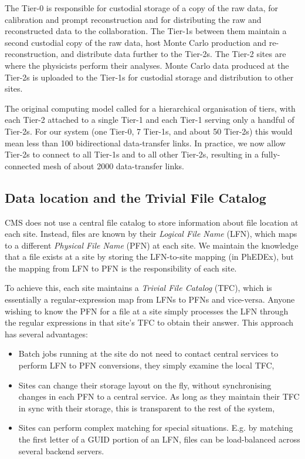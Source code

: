 The Tier-0 is responsible for custodial storage of a copy of the raw data, for calibration and prompt 
reconstruction and for distributing the raw and reconstructed data to the collaboration. The 
Tier-1s between them maintain a second custodial copy of the raw data, host Monte Carlo production and
re-reconstruction, and distribute data further to the Tier-2s.
The Tier-2 sites are where the physicists perform their analyses. Monte Carlo data 
produced at the Tier-2s is uploaded to the Tier-1s for custodial storage and distribution to other sites.

The original computing model \cite{CTDR} called for a hierarchical organisation of tiers, with each Tier-2 
attached to a single Tier-1 and each Tier-1 serving only a handful of Tier-2s. For our system (one 
Tier-0, 7 Tier-1s, and about 50 Tier-2s) this would mean less than 100 bidirectional data-transfer links. In 
practice, we now allow Tier-2s to connect to all Tier-1s and to all other Tier-2s, resulting in a 
fully-connected mesh of about 2000 data-transfer links.

\subsection{Data location and the Trivial File Catalog}
CMS does not use a central file catalog to store information about file location at each site. 
Instead, files are known by their {\it Logical File Name} (LFN), which maps to a different {\it 
Physical File Name} (PFN) at each site. We maintain the knowledge that a file exists at a site by 
storing the LFN-to-site mapping (in PhEDEx), but the mapping from LFN to PFN is the responsibility 
of each site.

To achieve this, each site maintains a {\it Trivial File Catalog} (TFC), which is essentially a 
regular-expression map from LFNs to PFNs and vice-versa. Anyone wishing to know the PFN for a file 
at a site simply processes the LFN through the regular expressions in that site's TFC to obtain 
their answer. This approach has several advantages:

\begin{itemize}
  \item Batch jobs running at the site do not need to contact central services to perform LFN to 
PFN conversions, they simply examine the local TFC,
  \item Sites can change their storage layout on the fly, without synchronising changes in each PFN
to a central service. As long as they maintain their TFC in sync with their storage, this is 
transparent to the rest of the system,
  \item Sites can perform complex matching for special situations. E.g. by matching the first 
letter of a GUID portion of an LFN, files can be load-balanced across several backend servers.
\end{itemize}
